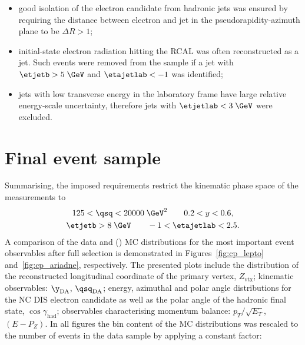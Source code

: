 \begin{itemize}
	\item good isolation of the electron candidate from hadronic jets was ensured by requiring the distance between electron and jet in the pseudorapidity-azimuth plane to be $\Delta R > 1$;
	\item initial-state electron radiation hitting the RCAL was often reconstructed as a jet. Such events were removed from the sample if a jet with $\etjetb > 5\;\GeV$ and $\etajetlab < -1$ was identified;
	\item jets with low transverse energy in the laboratory frame have large relative energy-scale uncertainty, therefore jets with $\etjetlab < 3\;\GeV$ were excluded.
\end{itemize}

\section{Final event sample}
\label{sec:eventsampletab}
Summarising, the imposed requirements restrict the kinematic phase space of the measurements to
\begin{gather}
125 < \qsq < 20000\;\GeV^2 \qquad 0.2 < y < 0.6, \label{eq:kinematicphasespacecuts}\\
\etjetb > 8\;\GeV \qquad -1 < \etajetlab < 2.5. \label{eq:jetphasespacecuts}
\end{gather}
A comparison of the data and \ariadne (\lepto) MC distributions for the most important event observables after full selection is demonstrated in Figures~\ref{fig:cp_lepto} and~\ref{fig:cp_ariadne}, respectively. The presented plots include the distribution of the reconstructed longitudinal coordinate of the primary vertex, $Z_\text{vtx}$; kinematic observables: $\y_\text{DA}$, $\qsq_\text{DA}$; energy, azimuthal and polar angle distributions for the NC DIS electron candidate as well as the polar angle of the hadronic final state, $\cos{\gamma_\text{had}}$; observables characterising momentum balance: $p_T/\sqrt{E_T}$, $\left(E-P_Z\right)$. In all figures the bin content of the MC distributions was rescaled to the number of events in the data sample by applying a constant factor:
